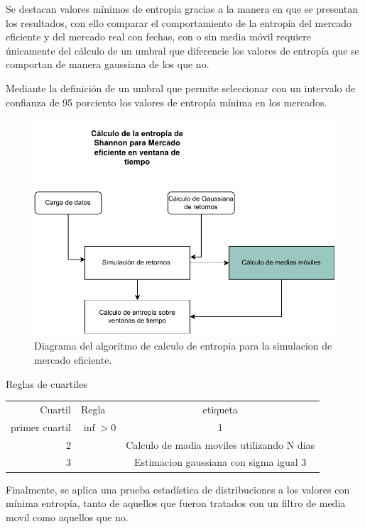 Se destacan valores mínimos de entropía gracias a la manera en que se presentan los resultados, con ello comparar el comportamiento de la entropía del mercado eficiente y del mercado real con fechas, con o sin media móvil requiere únicamente del cálculo de un umbral que diferencie los valores de entropía que se comportan de manera gaussiana  de los que no.

Mediante la definición de un umbral que permite seleccionar con un intervalo de confianza de 95 porciento los valores de entropía mínima en los mercados. 

\begin{figure}
	\centering
	\includegraphics[width=0.9\linewidth]{figures/simulacion}
	\caption{Diagrama del algoritmo de calculo de entropia para la simulacion de mercado eficiente. }
	\label{simulacion}
\end{figure}

Reglas de cuartiles
\begin{center}
	\begin{tabular}{ |r | l | c| }
		 \hline
		Cuartil & Regla & etiqueta \\
		primer cuartil & $\inf > 0$ & 1 \\
		2 &   & Calculo de madia moviles utilizando N dias\\ 
		3 &     &Estimacion gaussiana con sigma igual 3 \\
		 \hline
	\end{tabular}
\end{center}



Finalmente, se aplica una prueba estadística de distribuciones a los valores con mínima entropía, tanto de aquellos que fueron tratados con un filtro de media movil como aquellos que no. 